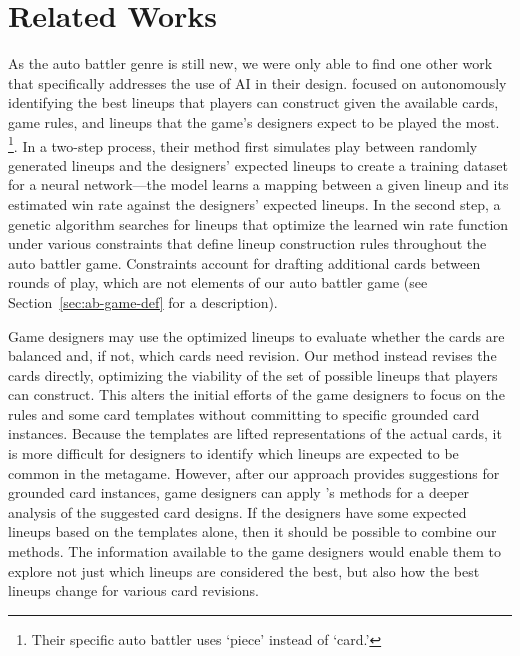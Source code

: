 \documentclass[letterpaper]{article} %
\begin{document}
\section{Related Works \label{sec:relatedworks}}
As the auto battler genre is still new, we were only able to find one other work
that specifically addresses the use of AI in their design.  \citeauthor{tencent_autobattle_lineup}
 focused on autonomously identifying the
best lineups that players can construct given the available cards, game rules, and
lineups that the game's designers expect to be played the most.
\footnote{Their specific auto battler %
uses `piece' instead of `card.'}. %
In a two-step process,
their method first simulates play between randomly generated lineups and the designers'
expected lineups to create a training dataset for a neural network---the model
learns a mapping between a given lineup and its estimated win rate against the
designers' expected lineups.  In the second step, a genetic algorithm searches for
lineups that optimize the learned win rate function under various constraints that
define lineup construction rules throughout the auto battler game.  Constraints
account for drafting additional cards between rounds of play,
which are not elements of
our auto battler game (see Section~\ref{sec:ab-game-def} for a description).

Game designers may use the optimized lineups %
to evaluate whether the cards are balanced and, if not, which
cards need revision.  Our method instead revises the cards directly, optimizing
the viability of the set of possible lineups that players can construct.  This alters
the initial efforts of the game designers to focus on the rules and some card templates
without committing to specific grounded card instances.  Because the templates are
lifted representations of the actual %
cards, it is more difficult for designers
to identify which lineups are expected to be common in the metagame.  However, after
our approach provides suggestions for grounded card instances, game designers
can apply \citeauthor{tencent_autobattle_lineup}'s methods for a deeper analysis
of the suggested card designs.  If the designers have some expected lineups based
on the templates alone, then it should be possible to combine our methods. %
The information available to the game
designers would enable them to explore not just which lineups are considered the
best, %
but also how the best lineups change for various card
revisions.
\end{document}
